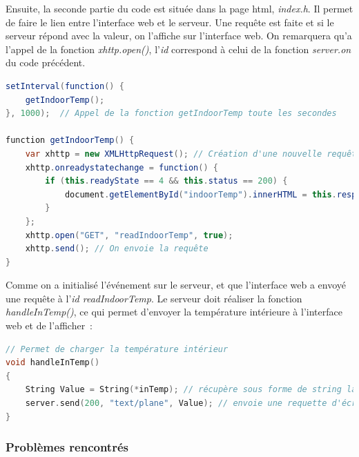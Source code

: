                \vspace{.5 cm}

                Ensuite, la seconde partie du code est située dans la page html, \textit{index.h}. Il permet de faire le lien entre l'interface web et le serveur. Une requête est faite et si le serveur répond avec la valeur, on l'affiche sur l'interface web. On remarquera
                qu'a l'appel de la fonction \textit{xhttp.open()}, l'\textit{id} correspond à celui de la fonction \textit{server.on} du code précédent.

\begin{lstlisting}[style=myJava, caption=Requête réalisée par l'interface web, language=Java, frame=lines]
setInterval(function() {
    getIndoorTemp();
}, 1000);  // Appel de la fonction getIndoorTemp toute les secondes

function getIndoorTemp() {
    var xhttp = new XMLHttpRequest(); // Création d'une nouvelle requête
    xhttp.onreadystatechange = function() {
        if (this.readyState == 4 && this.status == 200) {
            document.getElementById("indoorTemp").innerHTML = this.responseText; // On précise à qu'elle endroit on doit afficher la valeure
        }
    };
    xhttp.open("GET", "readIndoorTemp", true); 
    xhttp.send(); // On envoie la requête
}
\end{lstlisting}

                \vspace{.5 cm}

                Comme on a initialisé l'événement sur le serveur, et que l'interface web a envoyé une requête à l'\textit{id readIndoorTemp}. Le serveur doit réaliser la fonction \textit{handleInTemp()}, ce qui permet d'envoyer la température intérieure 
                à l'interface web et de l'afficher~: 

\begin{lstlisting}[style=myC, caption=Requête réalisée par l'interface web, language=C, frame=lines]
// Permet de charger la température intérieur
void handleInTemp()
{
    String Value = String(*inTemp); // récupère sous forme de string la temp
    server.send(200, "text/plane", Value); // envoie une requette d'écriture au serveur web
}
\end{lstlisting}

            \subsubsection{Problèmes rencontrés}

